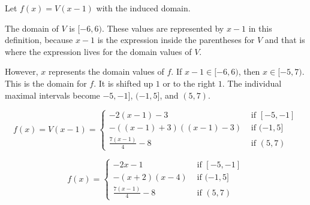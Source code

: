 \documentclass{ximera}
\begin{document}
\begin{example}
Let $f(x) = V(x-1)$ with the induced domain.

The domain of $V$ is $[-6, 6)$.  These values are represented by $x-1$ in this definition, because $x-1$ is the expression inside the parentheses for $V$ and that is where the expression lives for the domain values of $V$.

However, $x$ represents the domain values of $f$.   If $x - 1 \in [-6, 6)$, then $x \in [-5, 7)$.  This is the domain for $f$.  It is shifted up $1$ or to the right $1$.  The individual maximal intervals become $-5, -1]$, $(-1, 5]$, and $(5, 7)$.





\[
f(x) = V(x-1) = 
\begin{cases}
  -2(x-1)-3 & \text{ if } [-5, -1]   \\
  -((x-1)+3)((x-1)-3) & \text{ if } (-1, 5]  \\
  \frac{7(x-1)}{4} - 8 & \text{ if } (5, 7)
\end{cases}
\]





\[
f(x) = 
\begin{cases}
  -2x - 1 & \text{ if } [-5, -1]   \\
  -(x+2)(x-4) & \text{ if } (-1, 5]  \\
  \frac{7(x-1)}{4} - 8 & \text{ if } (5, 7)
\end{cases}
\]

















\begin{image}
\end{image}
\end{example}
\end{document}
